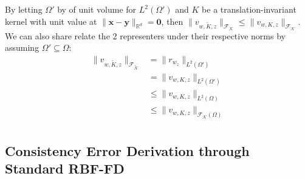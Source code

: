\documentclass[11pt]{article}
\begin{document}
By letting $\Omega'$ by of unit volume for $L^2(\Omega')$ and $K$ be a translation-invariant kernel with unit value at $\|\bm{x} - \bm{y} \|_{\mathbb{R}^d} = \bm{0}$, then $\| v_{w,\tilde{K},z} \|_{\mathcal{F_{K}}} \le \| v_{w,K,z} \|_{\mathcal{F_{K}}}$. We can also share relate the 2 representers under their respective norms by assuming $\Omega' \subseteq \Omega$:
\begin{align*}
	\| v_{w,\tilde{K},z} \|_{\mathcal{F_{\tilde{K}}}} &= \| r_{w_z} \|_{L^2(\Omega')}\\
	&= \| v_{w,K,z} \|_{L^2(\Omega')}\\
	&\le \| v_{w,K,z} \|_{L^2(\Omega)}\\
	&\le \| v_{w,K,z} \|_{\mathcal{F_{K}}(\Omega)}\\	
\end{align*}

\pagebreak

\subsection{Consistency Error Derivation through Standard RBF-FD}
\end{document}
